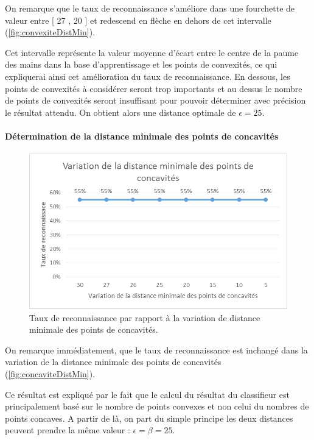 On remarque que le taux de reconnaissance s’améliore dans une fourchette de valeur entre [ 27 , 20 ] et redescend en flèche en dehors de cet intervalle (\autoref{fig:convexiteDistMin}).

Cet intervalle représente la valeur moyenne d’écart entre le centre de la paume des mains dans la base d’apprentissage et les points de convexités, ce qui expliquerai ainsi cet amélioration du taux de reconnaissance. En dessous, les points de convexités à considérer seront trop importants et au dessus le nombre de points de convexités seront insuffisant pour pouvoir déterminer avec précision le résultat attendu.
On obtient alors une distance optimale de $\epsilon = 25$.

\paragraph{Détermination de la distance minimale des points de concavités}
\begin{figure}[htb!]
\centerline{\includegraphics{concaviteDistMin.png}}
\caption{Taux de reconnaissance par rapport à la variation de distance minimale des points de concavités.}
\label{fig:concaviteDistMin}
\end{figure}

On remarque immédiatement, que le taux de reconnaissance est inchangé dans la variation de la distance minimale des points de concavités (\autoref{fig:concaviteDistMin}).

Ce résultat est expliqué par le fait que le calcul du résultat du classifieur est principalement basé sur le nombre de points convexes et non celui du nombres de points concaves. A partir de là, on part du simple principe les deux distances peuvent prendre la même valeur : $\epsilon = \beta = 25$.

